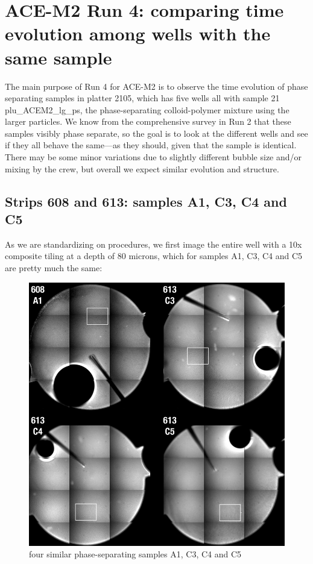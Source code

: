 \section{ACE-M2 Run 4: comparing time evolution among wells with the same sample}\hypertarget{ace-m2-run-4-comparing-time-evolution-among-wells-with-the-same-sample}{}\label{ace-m2-run-4-comparing-time-evolution-among-wells-with-the-same-sample}
The main purpose of Run 4 for ACE-M2 is to observe the time evolution of phase
separating samples in platter 2105, which has five wells all with sample 21 plu\_ACEM2\_lg\_ps, the
phase-separating colloid-polymer mixture using the larger particles. We know
from the comprehensive survey in Run 2 that these samples visibly phase
separate, so the goal is to look at the different wells and see if they all
behave the same---as they should, given that the sample is identical. There may
be some minor variations due to slightly different bubble size and/or mixing by
the crew, but overall we expect similar evolution and structure.

\subsection{Strips 608 and 613: samples A1, C3, C4 and C5}\hypertarget{strips-608-and-613-samples-a1-c3-c4-and-c5}{}\label{strips-608-and-613-samples-a1-c3-c4-and-c5}
As we are standardizing on procedures, we first image the entire well with a 10x
composite tiling at a depth of 80 microns, which for samples A1, C3, C4 and C5
are pretty much the same:
\begin{figure}
\begin{center}
\includegraphics[width=\columnwidth]{./images/2014_07_14_ace_m2_run4/A1_C345_80uM_run4_web.png}
\end{center}
\caption{four similar phase-separating samples A1, C3, C4 and C5}
\end{figure}

